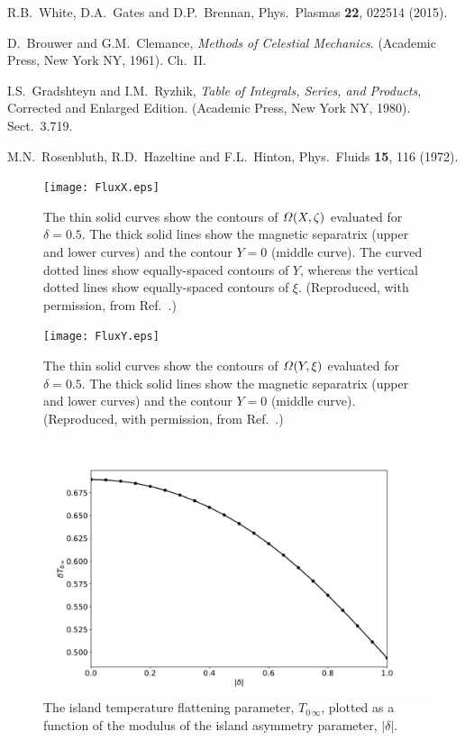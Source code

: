 \documentclass[12pt,prb,aps]{revtex4-1}
\begin{document}
\begin{thebibliography}{99}
 R.B.~White, D.A.~Gates and D.P.~Brennan, Phys.\ Plasmas {\bf 22}, 022514 (2015). 

 D.~Brouwer and G.M.~Clemance, {\em Methods of Celestial Mechanics}. (Academic Press, New York NY, 1961).  Ch.~II.

 I.S.~Gradshteyn and I.M.~Ryzhik, {\em Table of Integrals, Series, and Products}, Corrected and Enlarged Edition. (Academic Press, New York NY, 1980). Sect.~3.719.

 M.N.~Rosenbluth, R.D.~Hazeltine and F.L.~Hinton, Phys.\ Fluids {\bf 15}, 116 (1972).

\end{thebibliography}

\newpage
\begin{figure}
\centerline{\texttt{[image: FluxX.eps]}}
\caption{The thin solid curves show the contours of ${\mit\Omega}(X,\zeta)$ evaluated for $\delta=0.5$. The thick solid
lines show the magnetic separatrix (upper and lower curves) and the contour $Y=0$ (middle curve). The curved dotted
lines show equally-spaced contours of $Y$, whereas the vertical dotted lines show equally-spaced contours of $\xi$. 
(Reproduced, with permission, from Ref.~.) \label{fig1}}
\end{figure}

\begin{figure}
\centerline{\texttt{[image: FluxY.eps]}}
\caption{The thin solid curves show the contours of ${\mit\Omega}(Y,\xi)$ evaluated for $\delta=0.5$. The thick solid
lines show the magnetic separatrix (upper and lower curves) and the contour $Y=0$ (middle curve). (Reproduced, with permission, from Ref.~.) \  \label{fig2}}
\end{figure}

\begin{figure}
\centerline{\includegraphics[width=\textwidth]{T0infty.pdf}}
\caption{The island temperature flattening parameter, $T_{0\,\infty}$, plotted as a function of the modulus of the island asymmetry parameter, $|\delta|$.  \label{fig3}}
\end{figure}
\end{document}
